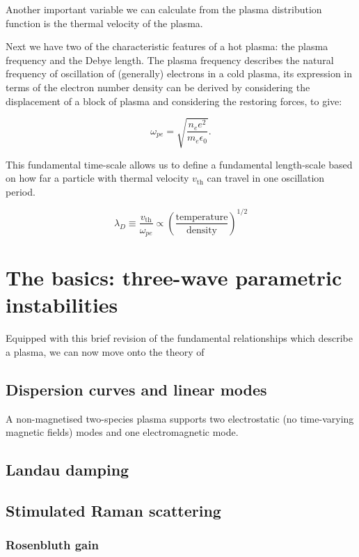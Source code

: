 Another important variable we can calculate from  the plasma distribution function is the thermal velocity of the plasma. 


Next we have two of the characteristic features of a hot plasma: the plasma frequency and the Debye length. The plasma frequency describes the natural frequency of oscillation of (generally) electrons in a cold plasma, its expression in terms of the electron number density can be derived by considering the displacement of a block of plasma and considering the restoring forces, to give:

\begin{equation}
	\omega_{pe} = \sqrt{\frac{n_e e^2}{m_e \epsilon_0}}.
\end{equation}

This fundamental time-scale allows us to define a fundamental length-scale based on how far a particle with thermal velocity $v_{\text{th}}$ can travel in one oscillation period.

\begin{equation}
	\lambda_D \equiv \frac{v_{\mathrm{th}}}{\omega_{pe}} \propto \left(\frac{\mathrm{temperature}}{\mathrm{density}}\right)^{1/2}
\end{equation}\label{eqn:debye}

\section{The basics: three-wave parametric instabilities}
Equipped with this brief revision of the fundamental relationships which describe a plasma, we can now move onto the theory of

\subsection{Dispersion curves and linear modes}

A non-magnetised two-species plasma supports two electrostatic (no time-varying magnetic fields) modes and one electromagnetic mode.

\subsection{Landau damping}

\subsection{Stimulated Raman scattering}

\subsubsection{Rosenbluth gain}

